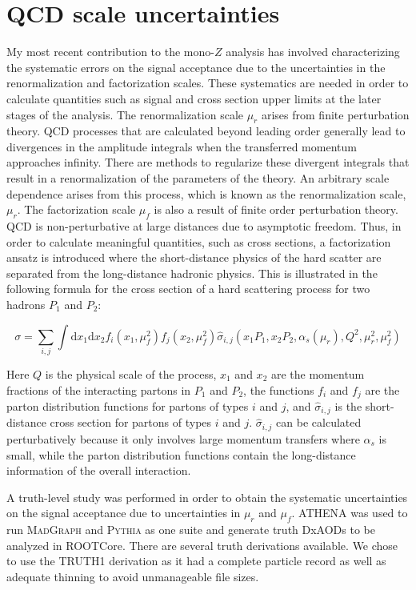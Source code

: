 \section{QCD scale uncertainties}
\label{sec:qcd}

My most recent contribution to the mono-$Z$ analysis has involved characterizing the systematic errors on the signal acceptance due to the uncertainties in the renormalization and factorization scales. These systematics are needed in order to calculate quantities such as signal and cross section upper limits at the later stages of the analysis. The renormalization scale $\mu_r$ arises from finite perturbation theory. QCD processes that are calculated beyond leading order generally lead to divergences in the amplitude integrals when the transferred momentum approaches infinity. There are methods to regularize these divergent integrals that result in a renormalization of the parameters of the theory. An arbitrary scale dependence arises from this process, which is known as the renormalization scale, $\mu_r$. The factorization scale $\mu_f$ is also a result of finite order perturbation theory. QCD is non-perturbative at large distances due to asymptotic freedom. Thus, in order to calculate meaningful quantities, such as cross sections, a factorization ansatz is introduced where the short-distance physics of the hard scatter are separated from the long-distance hadronic physics. This is illustrated in the following formula for the cross section of a hard scattering process for two hadrons $P_1$ and $P_2$:

\begin{equation}
\sigma = \sum_{i,j} \int \text{d}x_1 \text{d}x_2 f_{i} (x_1, \mu_f^2) f_{j} (x_2, \mu_f^2) \hat{\sigma}_{i,j} (x_1 P_1, x_2 P_2, \alpha_s(\mu_r), Q^2, \mu_r^2, \mu_f^2)
\end{equation}

\noindent Here $Q$ is the physical scale of the process, $x_1$ and $x_2$ are the momentum fractions of the interacting partons in $P_1$ and $P_2$, the functions $f_i$ and $f_j$ are the parton distribution functions for partons of types $i$ and $j$, and $\hat{\sigma}_{i,j}$ is the short-distance cross section for partons of types $i$ and $j$. $\hat{\sigma}_{i,j}$ can be calculated perturbatively because it only involves large momentum transfers where $\alpha_s$ is small, while the parton distribution functions contain the long-distance information of the overall interaction.

A truth-level study was performed in order to obtain the systematic uncertainties on the signal acceptance due to uncertainties in $\mu_r$ and $\mu_f$. ATHENA was used to run \textsc{MadGraph} and \textsc{Pythia} as one suite and generate truth DxAODs to be analyzed in ROOTCore. There are several truth derivations available. We chose to use the TRUTH1 derivation as it had a complete particle record as well as adequate thinning to avoid unmanageable file sizes.

